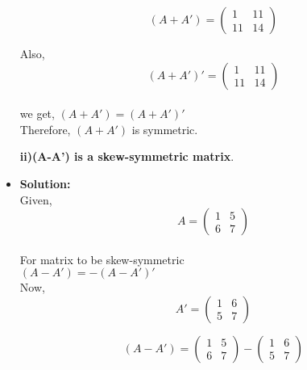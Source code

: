 \documentclass{article}
\begin{document}
\begin{itemize}
 \[
 (A+A')=
 \begin{pmatrix}
 1 & 11\\
 11 & 14 
 \end{pmatrix}
 \] 

Also,\\

 \[
 (A+A')'=
 \begin{pmatrix}
 1 & 11\\
 11 & 14 
 \end{pmatrix}
 \] \\
 we get, $(A+A')=(A+A')'$\\
 
 Therefore, $(A+A')$ is symmetric.



































\textbf{ii)(A-A') is a skew-symmetric matrix}.\\

\item{\textbf{Solution:}}\\
 
 Given,\\
 
 \[
 A=
 \begin{pmatrix}
 1 & 5\\
 6 & 7 
 \end{pmatrix}
 \]\\
 
For matrix to be skew-symmetric\\

$(A-A')=-(A-A')'$\\
 
  Now,\\
 \[
 A'=
 \begin{pmatrix}
 1 & 6\\
 5 & 7 
 \end{pmatrix}
 \]

 
 \[
 (A-A')=
 \begin{pmatrix}
 1 & 5\\
 6 & 7 
 \end{pmatrix}
 -
\begin{pmatrix}
 1 & 6\\
 5 & 7 
 \end{pmatrix}
 \] 
 

\end{itemize}
\end{document}
